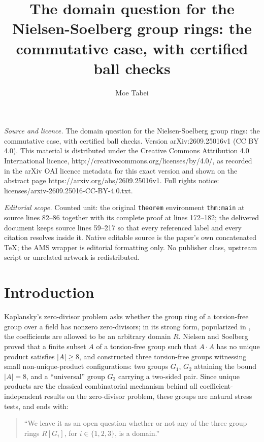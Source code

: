 \documentclass[10pt,a4paper]{amsart}
\newcommand{\GOne}{G_1}
\newcommand{\GTwo}{G_2}
\newcommand{\GThree}{G_3}
\begin{document}
\title[The domain question for the Nielsen-Soelberg group rings: th]{The domain question for the Nielsen-Soelberg group rings: the commutative case, with certified ball checks}
\author{Moe Tabei}
\date{}
\maketitle
\noindent\emph{Source and licence.} The domain question for the Nielsen-Soelberg group rings: the commutative case, with certified ball checks. Version arXiv:2609.25016v1 (CC BY 4.0). This material is distributed under the Creative Commons Attribution 4.0 International licence, http://creativecommons.org/licenses/by/4.0/, as recorded in the arXiv OAI licence metadata for this exact version and shown on the abstract page https://arxiv.org/abs/2609.25016v1. Full rights notice: licenses/arxiv-2609.25016-CC-BY-4.0.txt.\par\smallskip
\noindent\textit{Editorial scope.} Counted unit: the original \texttt{theorem} environment \texttt{thm:main} at source lines 82--86 together with its complete proof at lines 172--182; the delivered document keeps source lines 59--217 so that every referenced label and every citation resolves inside it. Native editable source is the paper's own concatenated TeX; the AMS wrapper is editorial formatting only. No publisher class, upstream script or unrelated artwork is redistributed.
\section{Introduction}\label{sec:intro}

Kaplansky's zero-divisor problem asks whether the group ring of a
torsion-free group over a field has nonzero zero-divisors; in its strong
form, popularized in \cite{NS}, the coefficients are allowed to be an
arbitrary domain $R$. Nielsen and Soelberg \cite{NS} proved that a finite
subset $A$ of a torsion-free group such that $A\cdot A$ has no unique
product satisfies $|A|\ge 8$, and constructed three torsion-free groups
witnessing small non-unique-product configurations: two groups $\GOne$,
$\GTwo$ attaining the bound $|A|=8$, and a ``universal'' group $\GThree$
carrying a two-sided pair. Since unique products are the classical
combinatorial mechanism behind all coefficient-independent results on the
zero-divisor problem, these groups are natural stress tests, and \cite{NS}
ends with:

\begin{quote}
``We leave it as an open question whether or not any of the three group
rings $R[G_i]$, for $i\in\{1,2,3\}$, is a domain.''
\end{quote}
\end{document}
